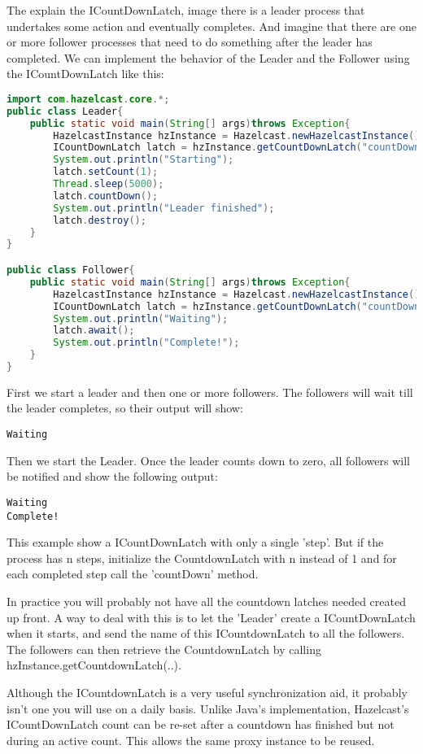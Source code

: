 The explain the ICountDownLatch, image there is a leader process that undertakes some action and eventually completes. And imagine that there are one or more follower processes that need to do something after the leader has completed. We can implement the behavior of the Leader and the Follower using the ICountDownLatch like this:
\begin{lstlisting}[language=java]
import com.hazelcast.core.*;
public class Leader{
    public static void main(String[] args)throws Exception{
        HazelcastInstance hzInstance = Hazelcast.newHazelcastInstance();
        ICountDownLatch latch = hzInstance.getCountDownLatch("countDownLatch");      
        System.out.println("Starting");
        latch.setCount(1); 
        Thread.sleep(5000);
        latch.countDown();
        System.out.println("Leader finished");
        latch.destroy();
    }
}

public class Follower{
    public static void main(String[] args)throws Exception{
        HazelcastInstance hzInstance = Hazelcast.newHazelcastInstance(); 
        ICountDownLatch latch = hzInstance.getCountDownLatch("countDownLatch");
        System.out.println("Waiting");
        latch.await();
        System.out.println("Complete!");
    }
}
\end{lstlisting}
First we start a leader and then one or more followers. The followers will wait till the leader completes, so their output will show:
\begin{lstlisting}
Waiting
\end{lstlisting}
Then we start the Leader. Once the leader counts down to zero, all followers will be notified and show the following output:
\begin{lstlisting}
Waiting
Complete!
\end{lstlisting}
This example show a ICountDownLatch with only a single 'step'. But if the process has n steps, initialize the CountdownLatch with n instead of 1 and for each completed step call the 'countDown' method.

In practice you will probably not have all the countdown latches needed created up front. A way to deal with this is to let the 'Leader' create a ICountDownLatch when it starts, and send the name of this ICountdownLatch to all the followers. The followers can then retrieve the CountdownLatch by calling hzInstance.getCountdownLatch(..).

Although the ICountdownLatch is a very useful synchronization aid, it probably isn't one you will use on a daily basis. Unlike Java's implementation, Hazelcast's ICountDownLatch count can be re-set after a countdown has finished but not during an active count. This allows the same proxy instance to be reused.

